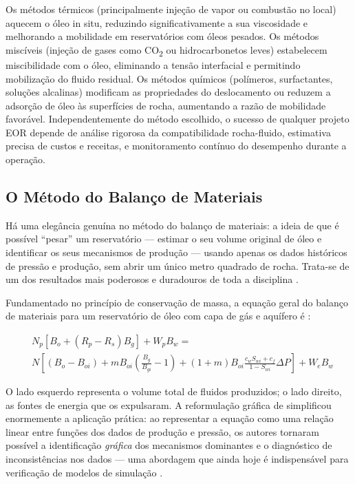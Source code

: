 \documentclass[
  12pt,
  a4paper,
  oneside,
  brazilian,
  sumario=tradicional
]{abntex2}
\begin{document}
Os métodos térmicos (principalmente injeção de vapor ou combustão no
local) aquecem o óleo in situ, reduzindo significativamente a sua
viscosidade e melhorando a mobilidade em reservatórios com óleos pesados.
Os métodos miscíveis (injeção de gases como CO\textsubscript{2} ou
hidrocarbonetos leves) estabelecem miscibilidade com o óleo, eliminando
a tensão interfacial e permitindo mobilização do fluido residual. Os
métodos químicos (polímeros, surfactantes, soluções alcalinas) modificam
as propriedades do deslocamento ou reduzem a adsorção de óleo às
superfícies de rocha, aumentando a razão de mobilidade favorável.
Independentemente do método escolhido, o sucesso de qualquer projeto EOR
depende de análise rigorosa da compatibilidade rocha-fluido, estimativa
precisa de custos e receitas, e monitoramento contínuo do desempenho
durante a operação.

\subsection{O Método do Balanço de Materiais}

Há uma elegância genuína no método do balanço de materiais: a ideia de
que é possível ``pesar'' um reservatório — estimar o seu volume
original de óleo e identificar os seus mecanismos de produção — usando
apenas os dados históricos de pressão e produção, sem abrir um único
metro quadrado de rocha. Trata-se de um dos resultados mais poderosos
e duradouros de toda a disciplina \cite{ahmed2010, rosa2006}.

Fundamentado no princípio de conservação de massa, a equação geral
do balanço de materiais para um reservatório de óleo com capa de gás
e aquífero é \cite{rosa2006}:

\begin{equation}
\begin{split}
& N_p\left[B_o + (R_p - R_s)B_g\right] + W_p B_w = \\
& N\left[(B_o - B_{oi}) + m B_{oi}\!\left(\frac{B_g}{B_{gi}}-1\right)
+ (1+m)B_{oi}\frac{c_w S_{wi}+c_f}{1-S_{wi}}\Delta P\right]
+ W_e B_w
\label{eq:balance}
\end{split}
\end{equation}

O lado esquerdo representa o volume total de fluidos produzidos; o
lado direito, as fontes de energia que os expulsaram. A reformulação
gráfica de \cite{havlena1963} simplificou enormemente a aplicação
prática: ao representar a equação como uma relação linear entre
funções dos dados de produção e pressão, os autores tornaram possível
a identificação \textit{gráfica} dos mecanismos dominantes e o
diagnóstico de inconsistências nos dados — uma abordagem que ainda
hoje é indispensável para verificação de modelos de simulação
\cite{rosa2006, dake2014}.
\end{document}
